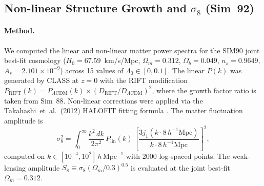\documentclass[12pt,a4paper]{article}
\begin{document}
\subsection{Non-linear Structure Growth and $\sigma_8$ (Sim~92)}
\label{sec:obs_sigma8}

\paragraph{Method.} We computed the linear and non-linear matter power spectra
for the SIM90 joint best-fit cosmology ($H_0 = 67.59$~km/s/Mpc, $\Omega_m = 0.312$,
$\Omega_b = 0.049$, $n_s = 0.9649$, $A_s = 2.101\times 10^{-9}$) across 15
values of $\Lambda_0 \in [0, 0.1]$. The linear $P(k)$ was generated by CLASS
at $z=0$ with the RIFT modification $P_{\mathrm{RIFT}}(k) = P_{\Lambda\mathrm{CDM}}(k)
\times (D_{\mathrm{RIFT}}/D_{\Lambda\mathrm{CDM}})^2$, where the growth factor
ratio is taken from Sim~88. Non-linear corrections were applied via the
Takahashi~et~al.\ (2012) HALOFIT fitting formula \citep{Takahashi2012}. The
matter fluctuation amplitude is
\begin{equation}
\sigma_8^2 = \int_0^\infty \frac{k^2\,dk}{2\pi^2}\,P_{\mathrm{lin}}(k)\,
\left[\frac{3j_1(k\cdot 8\,h^{-1}\mathrm{Mpc})}{k\cdot 8\,h^{-1}\mathrm{Mpc}}\right]^2,
\end{equation}
computed on $k \in [10^{-4}, 10^2]\,h\,\mathrm{Mpc}^{-1}$ with 2000 log-spaced
points. The weak-lensing amplitude $S_8 \equiv \sigma_8(\Omega_m/0.3)^{0.5}$
is evaluated at the joint best-fit $\Omega_m = 0.312$.
\end{document}
